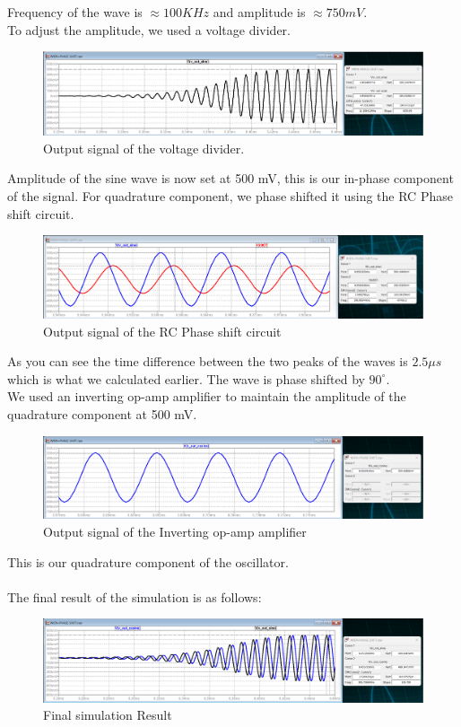Frequency of the wave is $\approx 100 KHz$ and amplitude is $\approx 750mV$.\\
To adjust the amplitude, we used a voltage divider.
\begin{figure}[H]
    \centering
    \includegraphics[width=1\linewidth]{voltage-div-output.png}
    \caption{Output signal of the voltage divider.}
    \label{fig:enter-label}
\end{figure}

Amplitude of the sine wave is now set at 500 mV, this is our in-phase component of the signal. For quadrature component, we phase shifted it using the RC Phase shift circuit.
\begin{figure}[H]
    \centering
    \includegraphics[width=1\linewidth]{RC-phase-shift-output.png}
    \caption{Output signal of the RC Phase shift circuit}
    \label{fig:rc-phase-shift-output}
\end{figure}
As you can see the time difference between the two peaks of the waves is $2.5 \mu s$ which is what we calculated earlier. The wave is phase shifted by $90^\circ$.\\
We used an inverting op-amp amplifier to maintain the amplitude of the quadrature component at 500 mV.
\begin{figure}[H]
    \centering
    \includegraphics[width=1\linewidth]{op-amp-amp-output.png}
    \caption{Output signal of the Inverting op-amp amplifier}
    \label{fig:enter-label}
\end{figure}

This is our quadrature component of the oscillator.\\
\\
The final result of the simulation is as follows:
\begin{figure}[H]
    \centering
    \includegraphics[width=1\linewidth]{Final-simulation-result.png}
    \caption{Final simulation Result}
    \label{fig:enter-label}
\end{figure}

